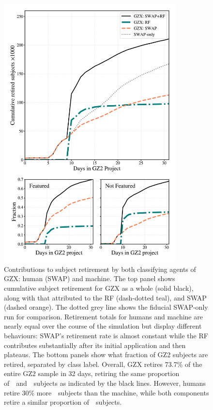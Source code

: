 \begin{figure}
\centering
\includegraphics[width=3.7in]{Figures/human_machine/GZX_component_contributions.pdf}
\caption[Individual contributions of human and machine to galaxy classification]{Contributions to subject retirement by both classifying agents of GZX: human (SWAP) and machine. The top panel shows cumulative subject retirement for GZX as a whole (solid black), along with that attributed to the RF (dash-dotted teal), and SWAP (dashed orange). The dotted grey line shows the fiducial SWAP-only run for comparison. Retirement totals for humans and machine are nearly equal over the course of the simulation but display different behaviours: SWAP's retirement rate is almost constant while the RF contributes substantially after its initial application and then plateaus.  The bottom panels show what fraction of GZ2 subjects are retired, separated by class label. Overall, GZX retires 73.7\% of the entire GZ2 sample in 32 days, retiring the same proportion of~\feat~and~\notfeat~subjects as indicated by the black lines. However, humans retire 30\% more~\feat~subjects than the machine, while both components retire a similar proportion of~\notfeat~subjects. \label{fig: gzx components}}
\end{figure}

